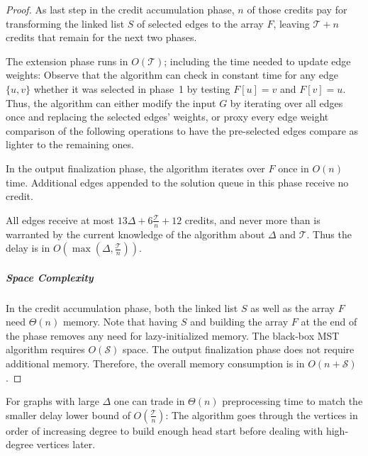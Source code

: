 \documentclass[a4paper, USenglish, cleveref, autoref, thm-restate]{lipics-v2021}
\newcommand{\maxdeg}{\Delta}
\newcommand{\totaltime}{\mathcal{T}}
\newcommand{\totalspace}{\mathcal{S}}
\begin{document}
\begin{proof}
	As last step in the credit accumulation phase, $n$ of those credits pay for transforming the linked list $S$ of selected edges to the array $F$, leaving $\totaltime + n$ credits that remain for the next two phases.
	
	The extension phase runs in $O(\totaltime)$; including the time needed to update edge weights:
	Observe that the algorithm can check in constant time for any edge $\{u,v\}$ whether it was selected in phase~1 by testing $F[u] = v$ and $F[v] = u$.
	Thus, the algorithm can either modify the input $G$ by iterating over all edges once and replacing the selected edges' weights, or proxy every edge weight comparison of the following operations to have the pre-selected edges compare as lighter to the remaining ones.
	
	In the output finalization phase, the algorithm iterates over $F$ once in $O(n)$ time.
	Additional edges appended to the solution queue in this phase receive no credit.
	
	All edges receive at most $13\maxdeg + 6\frac{\totaltime}{n} + 12$ credits, and never more than is warranted by the current knowledge of the algorithm about $\maxdeg$ and $\totaltime$.
	Thus the delay is in $O(\max(\maxdeg, \frac{\totaltime}{n}))$.
	
	\subparagraph*{Space Complexity}
	
	In the credit accumulation phase, both the linked list $S$ as well as the array $F$ need $\Theta(n)$ memory.
	Note that having $S$ and building the array $F$ at the end of the phase removes any need for lazy-initialized memory.
	The black-box MST algorithm requires $O(\totalspace)$ space.
	The output finalization phase does not require additional memory.
	Therefore, the overall memory consumption is in $O(n + \totalspace)$.
\end{proof}

For graphs with large $\maxdeg$ one can trade in $\Theta(n)$ preprocessing time to match the smaller delay lower bound of $O(\frac{\totaltime}{n})$:
The algorithm goes through the vertices in order of increasing degree to build enough head start before dealing with high-degree vertices later.
\end{document}
